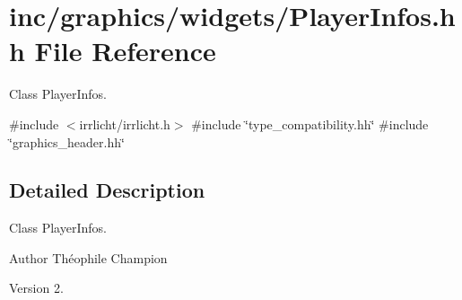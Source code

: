 \hypertarget{PlayerInfos_8hh}{}\section{inc/graphics/widgets/\+Player\+Infos.hh File Reference}
\label{PlayerInfos_8hh}


Class Player\+Infos.  


{\ttfamily \#include $<$irrlicht/irrlicht.\+h$>$}\newline
{\ttfamily \#include \char`\"{}type\+\_\+compatibility.\+hh\char`\"{}}\newline
{\ttfamily \#include \char`\"{}graphics\+\_\+header.\+hh\char`\"{}}\newline


\subsection{Detailed Description}
Class Player\+Infos. 

\begin{DoxyAuthor}{Author}
Théophile Champion 
\end{DoxyAuthor}
\begin{DoxyVersion}{Version}
2. 
\end{DoxyVersion}
